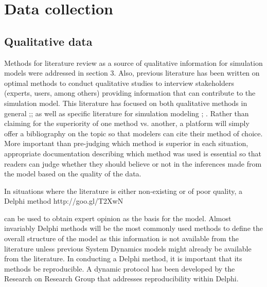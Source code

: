 \documentclass[11pt]{article}
\begin{document}
\section {Data collection}

\subsection {Qualitative data} 
Methods for literature review as a source of qualitative information for simulation models were addressed in section 3.  Also, previous literature has been written on optimal methods to conduct qualitative studies to interview stakeholders (experts, users, among others) providing information that can contribute to the simulation model.  This literature has focused on both qualitative methods in general \cite{Yin2002};\cite{Marshall2006}; \cite{Silverman2004}  as well as specific literature for simulation modeling \cite{Laws2004}; \cite{Luna-Reyes2003}.  Rather than claiming for the superiority of one method vs. another, a platform will simply offer a bibliography on the topic so that modelers can cite their method of choice.  More important than pre-judging which method is superior in each situation, appropriate documentation describing which method was used is essential so that readers can judge whether they should believe or not in the inferences made from the model based on the quality of the data. 

In situations where the literature is either non-existing or of poor quality, a Delphi method http://goo.gl/T2XwN 

can be used to obtain expert opinion as the basis for the model. Almost invariably Delphi methods will be the most commonly used methods to define the overall structure of the model as this information is not available from the literature unless previous System Dynamics models might already be available from the literature. In conducting a Delphi method, it is important that its methods be reproducible. A dynamic protocol has been developed by the Research on Research Group that addresses reproducibility within Delphi. 

\end{document}
